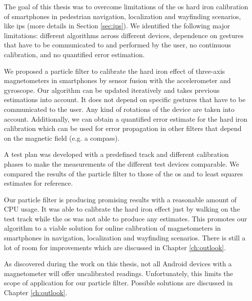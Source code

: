 The goal of this thesis was to overcome limitations of the \gls{os} hard iron calibration of smartphones in pedestrian navigation, localization and wayfinding scenarios, like \gls{ips} (more details in Section \ref{sec:ips}). We identified the following major limitations: different algorithms across different devices, dependence on gestures that have to be communicated to and performed by the user, no continuous calibration, and no quantified error estimation.

We proposed a particle filter to calibrate the hard iron effect of three-axis magnetometers in smartphones by sensor fusion with the accelerometer and gyroscope. Our algorithm can be updated iteratively and takes previous estimations into account. It does not depend on specific gestures that have to be communicated to the user. Any kind of rotations of the device are taken into account. Additionally, we can obtain a quantified error estimate for the hard iron calibration which can be used for error propagation in other filters that depend on the magnetic field (e.g. a compass).

A test plan was developed with a predefined track and different calibration phases to make the measurements of the different test devices comparable. We compared the results of the particle filter to those of the \gls{os} and to least squares estimates for reference. 

Our particle filter is producing promising results with a reasonable amount of CPU usage. It was able to calibrate the hard iron effect just by walking on the test track while the \gls{os} was not able to produce any estimates. This promotes our algorithm to a viable solution for online calibration of magnetometers in smartphones in navigation, localization and wayfinding scenarios. There is still a lot of room for improvements which are discussed in Chapter \ref{ch:outlook}.

As discovered during the work on this thesis, not all Android devices with a magnetometer will offer uncalibrated readings. Unfortunately, this limits the scope of application for our particle filter. Possible solutions are discussed in Chapter \ref{ch:outlook}.
